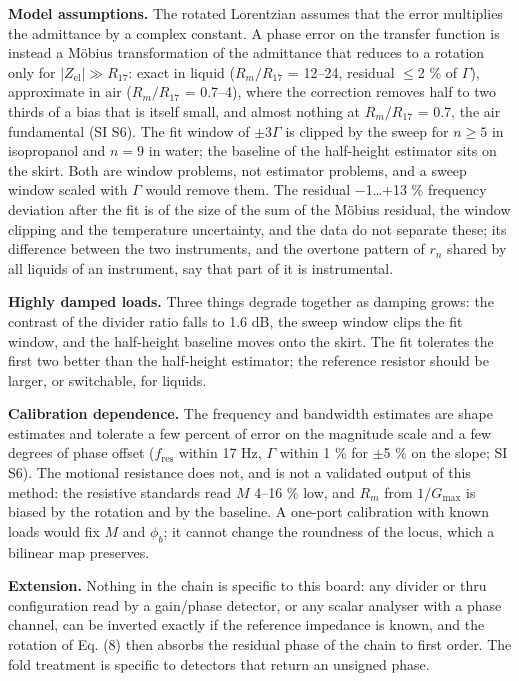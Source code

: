 \documentclass[11pt,a4paper]{article}
\begin{document}
\textbf{Model assumptions.} The rotated Lorentzian assumes that the error multiplies the admittance by a complex constant. A phase error on the transfer function is instead a Möbius transformation of the admittance that reduces to a rotation only for $|Z_\mathrm{el}| \gg R_{17}$: exact in liquid ($R_m/R_{17}$ = 12--24, residual $\le$2 \% of $\Gamma$), approximate in air ($R_m/R_{17}$ = 0.7--4), where the correction removes half to two thirds of a bias that is itself small, and almost nothing at $R_m/R_{17}$ = 0.7, the air fundamental (SI S6). The fit window of $\pm$3$\Gamma$ is clipped by the sweep for $n \ge 5$ in isopropanol and $n = 9$ in water; the baseline of the half-height estimator sits on the skirt. Both are window problems, not estimator problems, and a sweep window scaled with $\Gamma$ would remove them. The residual $-$1\ldots{}+13 \% frequency deviation after the fit is of the size of the sum of the Möbius residual, the window clipping and the temperature uncertainty, and the data do not separate these; its difference between the two instruments, and the overtone pattern of $r_n$ shared by all liquids of an instrument, say that part of it is instrumental.

\textbf{Highly damped loads.} Three things degrade together as damping grows: the contrast of the divider ratio falls to 1.6 dB, the sweep window clips the fit window, and the half-height baseline moves onto the skirt. The fit tolerates the first two better than the half-height estimator; the reference resistor should be larger, or switchable, for liquids.

\textbf{Calibration dependence.} The frequency and bandwidth estimates are shape estimates and tolerate a few percent of error on the magnitude scale and a few degrees of phase offset ($f_\mathrm{res}$ within 17 Hz, $\Gamma$ within 1 \% for $\pm$5 \% on the slope; SI S6). The motional resistance does not, and is not a validated output of this method: the resistive standards read $M$ 4--16 \% low, and $R_m$ from $1/G_\mathrm{max}$ is biased by the rotation and by the baseline. A one-port calibration with known loads would fix $M$ and $\phi_b$; it cannot change the roundness of the locus, which a bilinear map preserves.

\textbf{Extension.} Nothing in the chain is specific to this board: any divider or thru configuration read by a gain/phase detector, or any scalar analyser with a phase channel, can be inverted exactly if the reference impedance is known, and the rotation of Eq. (8) then absorbs the residual phase of the chain to first order. The fold treatment is specific to detectors that return an unsigned phase.
\end{document}
